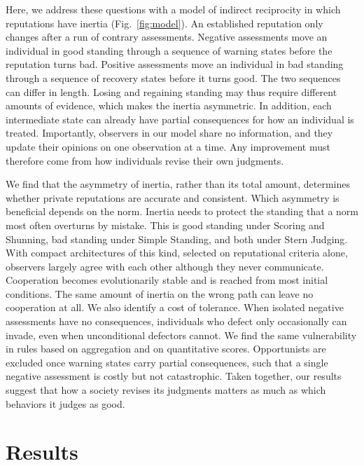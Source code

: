 \documentclass[10pt]{wlscirep}
\theoremstyle{plain}
\theoremstyle{remark}
\begin{document}
Here, we address these questions with a model of indirect reciprocity in which reputations have inertia (Fig.~\ref{fig:model}). An established reputation only changes after a run of contrary assessments. Negative assessments move an individual in good standing through a sequence of warning states before the reputation turns bad. Positive assessments move an individual in bad standing through a sequence of recovery states before it turns good. The two sequences can differ in length. Losing and regaining standing may thus require different amounts of evidence, which makes the inertia asymmetric. In addition, each intermediate state can already have partial consequences for how an individual is treated. Importantly, observers in our model share no information, and they update their opinions on one observation at a time. Any improvement must therefore come from how individuals revise their own judgments.

We find that the asymmetry of inertia, rather than its total amount, determines whether private reputations are accurate and consistent. Which asymmetry is beneficial depends on the norm. Inertia needs to protect the standing that a norm most often overturns by mistake. This is good standing under Scoring and Shunning, bad standing under Simple Standing, and both under Stern Judging. With compact architectures of this kind, selected on reputational criteria alone, observers largely agree with each other although they never communicate. Cooperation becomes evolutionarily stable and is reached from most initial conditions. The same amount of inertia on the wrong path can leave no cooperation at all. We also identify a cost of tolerance. When isolated negative assessments have no consequences, individuals who defect only occasionally can invade, even when unconditional defectors cannot. We find the same vulnerability in rules based on aggregation and on quantitative scores. Opportunists are excluded once warning states carry partial consequences, such that a single negative assessment is costly but not catastrophic. Taken together, our results suggest that how a society revises its judgments matters as much as which behaviors it judges as good.

\section*{Results}
\end{document}
